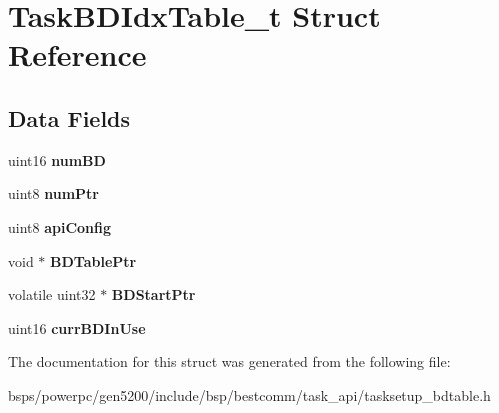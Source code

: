 \hypertarget{structTaskBDIdxTable__t}{}\section{Task\+B\+D\+Idx\+Table\+\_\+t Struct Reference}
\label{structTaskBDIdxTable__t}
\subsection*{Data Fields}
\begin{DoxyCompactItemize}
\item 
\mbox{\label{structTaskBDIdxTable__t_a135d538b8bcead111a309ec9c5966c43}} 
uint16 {\bfseries num\+BD}
\item 
\mbox{\label{structTaskBDIdxTable__t_a1fb350efe8f56d17374612c228306017}} 
uint8 {\bfseries num\+Ptr}
\item 
\mbox{\label{structTaskBDIdxTable__t_a6ec1eccf159c3efd848afe8a8353bb0f}} 
uint8 {\bfseries api\+Config}
\item 
\mbox{\label{structTaskBDIdxTable__t_a2c913e481a83424d5d468ded4726b384}} 
void $\ast$ {\bfseries B\+D\+Table\+Ptr}
\item 
\mbox{\label{structTaskBDIdxTable__t_abe4ab39e7305915e0878fd16040f6857}} 
volatile uint32 $\ast$ {\bfseries B\+D\+Start\+Ptr}
\item 
\mbox{\label{structTaskBDIdxTable__t_ac3ff172d94c71b1ad7fc7027c67004de}} 
uint16 {\bfseries curr\+B\+D\+In\+Use}
\end{DoxyCompactItemize}


The documentation for this struct was generated from the following file\+:\begin{DoxyCompactItemize}
\item 
bsps/powerpc/gen5200/include/bsp/bestcomm/task\+\_\+api/tasksetup\+\_\+bdtable.\+h\end{DoxyCompactItemize}
